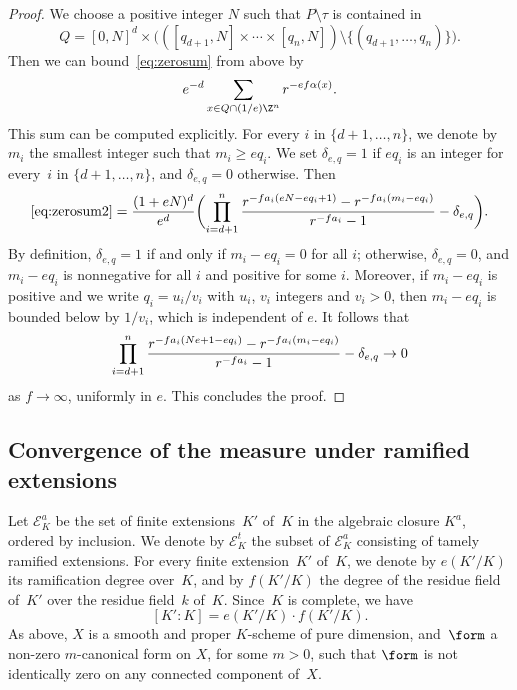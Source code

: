 \begin{proof}
We choose a positive integer $N$ such that
$P\setminus \tau$ is contained in
\[
Q=[0,N]^{d}\times \bigl(([q_{d+1},N]\times \cdots \times [q_{n},N])\setminus \{(q_{d+1},\ldots,q_n)\}\bigr).
\]
Then we can bound~\eqref{eq:zerosum} from above by
\begin{equation}\label{eq:zerosum2}
e^{-d}\sum_{x\in Q\cap (1/e)\Z^n}r^{-ef\alpha(x)}.
\end{equation}
This sum can be computed explicitly. For every $i$ in $\{d+1,\ldots,n\}$, we denote by $m_i$ the smallest integer such that
$m_i\geq eq_i$. We set $\delta_{e,q}=1$ if $eq_i$ is an integer for every~$i$ in $\{d+1,\ldots,n\}$, and $\delta_{e,q}=0$ otherwise. Then
\[
\eqref{eq:zerosum2}=\frac{(1+eN)^d}{e^d}\biggl( \prod_{i=d+1}^{n}\frac{r^{-fa_i(eN-eq_i+1)}- r^{-fa_i(m_i-eq_i)}}{r^{-fa_i}-1} - \delta_{e,q}\biggr).
\]
By definition, $\delta_{e,q}=1$ if and only if $m_i-eq_i=0$ for all $i$; otherwise, $\delta_{e,q}=0$, and $m_i-eq_i$ is nonnegative for all $i$ and positive for some $i$. Moreover, if $m_i-eq_i$ is positive and we write $q_i=u_i/v_i$ with $u_i$, $v_i$ integers and $v_i>0$, then $m_i-eq_i$ is bounded below by $1/v_i$, which is independent of $e$.
It follows that\vspace*{-3pt}
\[
\prod_{i=d+1}^{n}\frac{r^{-fa_i(Ne+1-eq_i)}- r^{-fa_i(m_i-eq_i)}}{r^{-fa_i}-1} - \delta_{e,q} \to 0\vspace*{-3pt}
\]
as $f\to \infty$, uniformly in $e$. This concludes the proof.
\end{proof}

\subsection{Convergence of the measure under ramified extensions}
Let $\mathcal{E}^a_K$ be the set of finite extensions~$K'$ of~$K$ in the algebraic closure $K^a$, ordered by inclusion. We denote by
$\mathcal{E}^t_K$ the subset of $\mathcal{E}^a_K$ consisting of tamely ramified extensions.
For every finite extension~$K'$ of~$K$, we denote by $e(K'/K)$ its ramification degree over~$K$, and by $f(K'/K)$ the degree of the residue field of~$K'$ over the residue field~$k$ of~$K$. Since~$K$ is complete, we have\vspace*{-3pt}
\[
[K'\colon K]=e(K'/K)\cdot f(K'/K).
\]
As above, $X$ is a smooth and proper $K$\nobreakdash-scheme of pure dimension, and~$\form$ a non-zero $m$-canonical form on $X$, for some $m>0$, such that
$\form$ is not identically zero on any connected component of~$X$.

